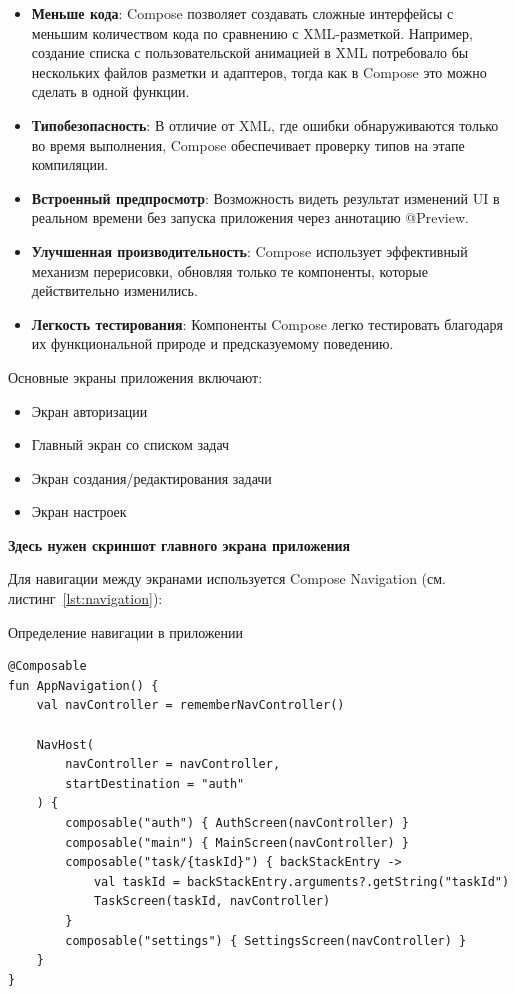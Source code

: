 \documentclass[14pt, russian]{scrartcl}
\begin{document}
\begin{itemize}
\item \textbf{Меньше кода}: Compose позволяет создавать сложные интерфейсы с меньшим количеством кода по сравнению с XML-разметкой. Например, создание списка с пользовательской анимацией в XML потребовало бы нескольких файлов разметки и адаптеров, тогда как в Compose это можно сделать в одной функции.

\item \textbf{Типобезопасность}: В отличие от XML, где ошибки обнаруживаются только во время выполнения, Compose обеспечивает проверку типов на этапе компиляции.

\item \textbf{Встроенный предпросмотр}: Возможность видеть результат изменений UI в реальном времени без запуска приложения через аннотацию @Preview.

\item \textbf{Улучшенная производительность}: Compose использует эффективный механизм перерисовки, обновляя только те компоненты, которые действительно изменились.

\item \textbf{Легкость тестирования}: Компоненты Compose легко тестировать благодаря их функциональной природе и предсказуемому поведению.
\end{itemize}

Основные экраны приложения включают:

\begin{itemize}
\item Экран авторизации
\item Главный экран со списком задач
\item Экран создания/редактирования задачи
\item Экран настроек
\end{itemize}

\textbf{Здесь нужен скриншот главного экрана приложения}

Для навигации между экранами используется Compose Navigation (см. листинг~\ref{lst:navigation}):

\begin{listing}[!htb]
\caption{Определение навигации в приложении}
\label{lst:navigation}
\begin{verbatim}
@Composable
fun AppNavigation() {
    val navController = rememberNavController()
    
    NavHost(
        navController = navController,
        startDestination = "auth"
    ) {
        composable("auth") { AuthScreen(navController) }
        composable("main") { MainScreen(navController) }
        composable("task/{taskId}") { backStackEntry ->
            val taskId = backStackEntry.arguments?.getString("taskId")
            TaskScreen(taskId, navController)
        }
        composable("settings") { SettingsScreen(navController) }
    }
}
\end{verbatim}
\end{listing}
\end{document}
